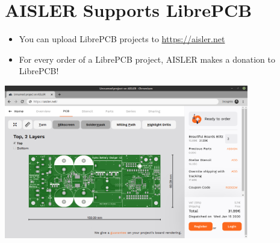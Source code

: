 \section{AISLER Supports LibrePCB}

\begin{frame}{\secname}
  \begin{itemize}
    \item You can upload LibrePCB projects to \url{https://aisler.net}
    \item For every order of a LibrePCB project, AISLER makes a donation to
          LibrePCB!
  \end{itemize}

  \begin{center}
    \includegraphics[width=0.8\textwidth]{images/aisler.png}
  \end{center}
\end{frame}
